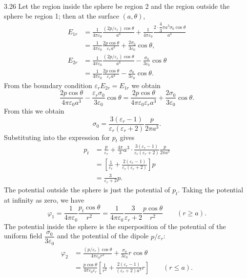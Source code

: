 \begin{solution}{3.26}
Let the region inside the sphere be region 2 and the region outside the sphere be region 1; then at the surface $(a,\theta)$,
\begin{align*}
E_{1r}&=\frac{1}{4\pi\varepsilon_0}\frac{(2p/\varepsilon_r)\cos\theta}{a^3}
+\frac{1}{4\pi\varepsilon_0}\frac{2\cdot\dfrac{4}{3}\pi a^3\sigma_0\cos\theta}{a^3}\\
&=\frac{1}{4\pi\varepsilon_0}\frac{2p\cos\theta}{\varepsilon_ra^3}
+\frac{2\sigma_0}{3\varepsilon_0}\cos\theta,\\[2pt]
E_{2r}&=\frac{1}{4\pi\varepsilon_0}\frac{(2p/\varepsilon_r)\cos\theta}{a^3}
-\frac{\sigma_0}{3\varepsilon_0}\cos\theta\\
&=\frac{1}{4\pi\varepsilon_0}\frac{2p\cos\theta}{\varepsilon_ra^3}
-\frac{\sigma_0}{3\varepsilon_0}\cos\theta.
\end{align*}
From the boundary condition $\varepsilon_rE_{2r}=E_{1r}$ we obtain
\[
\frac{2p\cos\theta}{4\pi\varepsilon_0a^3}-\frac{\varepsilon_r\sigma_0}{3\varepsilon_0}\cos\theta
=\frac{2p\cos\theta}{4\pi\varepsilon_0\varepsilon_ra^3}+\frac{2\sigma_0}{3\varepsilon_0}\cos\theta.
\]
From this we obtain
\[
\sigma_0=\frac{3(\varepsilon_r-1)}{\varepsilon_r(\varepsilon_r+2)}\frac{p}{2\pi a^3}.
\]
Substituting into the expression for $p_t$ gives
\begin{align*}
p_t&=\frac{p}{\varepsilon_r}+\frac{4\pi}{3}a^3\cdot
\frac{3(\varepsilon_r-1)}{\varepsilon_r(\varepsilon_r+2)}\frac{p}{2\pi a^3}\\
&=\left[\frac{1}{\varepsilon_r}+\frac{2(\varepsilon_r-1)}{\varepsilon_r(\varepsilon_r+2)}\right]p\\
&=\frac{3}{\varepsilon_r+2}p.
\end{align*}
The potential outside the sphere is just the potential of $p_t$. Taking the potential at infinity as zero, we have
\[
\varphi_1=\frac{1}{4\pi\varepsilon_0}\frac{p_t\cos\theta}{r^2}
=\frac{1}{4\pi\varepsilon_0}\frac{3}{\varepsilon_r+2}\frac{p\cos\theta}{r^2}
\qquad(r\ge a).
\]
The potential inside the sphere is the superposition of the potential of the uniform field $\dfrac{\sigma_0}{3\varepsilon_0}$ and the potential of the dipole $p/\varepsilon_r$:
\begin{align*}
\varphi_2&=\frac{(p/\varepsilon_r)\cos\theta}{4\pi\varepsilon_0r^2}
+\frac{\sigma_0}{3\varepsilon_0}r\cos\theta\\
&=\frac{p\cos\theta}{4\pi\varepsilon_0\varepsilon_r}
\left[\frac{1}{r^2}+\frac{2(\varepsilon_r-1)}{(\varepsilon_r+2)a^3}r\right]
\qquad(r\le a).
\end{align*}
\end{solution}

